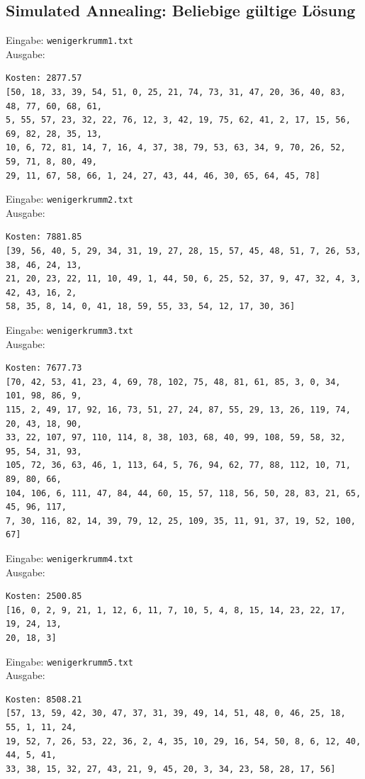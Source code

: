 \documentclass[a4paper,10pt,ngerman]{scrartcl}
\begin{document}
\subsection{Simulated Annealing: Beliebige gültige Lösung}
Eingabe: \lstinline|wenigerkrumm1.txt| \\ Ausgabe:
\begin{lstlisting}
Kosten: 2877.57
[50, 18, 33, 39, 54, 51, 0, 25, 21, 74, 73, 31, 47, 20, 36, 40, 83, 48, 77, 60, 68, 61, 
5, 55, 57, 23, 32, 22, 76, 12, 3, 42, 19, 75, 62, 41, 2, 17, 15, 56, 69, 82, 28, 35, 13, 
10, 6, 72, 81, 14, 7, 16, 4, 37, 38, 79, 53, 63, 34, 9, 70, 26, 52, 59, 71, 8, 80, 49, 
29, 11, 67, 58, 66, 1, 24, 27, 43, 44, 46, 30, 65, 64, 45, 78]
\end{lstlisting}
Eingabe: \lstinline|wenigerkrumm2.txt| \\ Ausgabe:
\begin{lstlisting}
Kosten: 7881.85
[39, 56, 40, 5, 29, 34, 31, 19, 27, 28, 15, 57, 45, 48, 51, 7, 26, 53, 38, 46, 24, 13, 
21, 20, 23, 22, 11, 10, 49, 1, 44, 50, 6, 25, 52, 37, 9, 47, 32, 4, 3, 42, 43, 16, 2, 
58, 35, 8, 14, 0, 41, 18, 59, 55, 33, 54, 12, 17, 30, 36]
\end{lstlisting}
Eingabe: \lstinline|wenigerkrumm3.txt| \\ Ausgabe:
\begin{lstlisting}
Kosten: 7677.73
[70, 42, 53, 41, 23, 4, 69, 78, 102, 75, 48, 81, 61, 85, 3, 0, 34, 101, 98, 86, 9,
115, 2, 49, 17, 92, 16, 73, 51, 27, 24, 87, 55, 29, 13, 26, 119, 74, 20, 43, 18, 90,
33, 22, 107, 97, 110, 114, 8, 38, 103, 68, 40, 99, 108, 59, 58, 32, 95, 54, 31, 93, 
105, 72, 36, 63, 46, 1, 113, 64, 5, 76, 94, 62, 77, 88, 112, 10, 71, 89, 80, 66, 
104, 106, 6, 111, 47, 84, 44, 60, 15, 57, 118, 56, 50, 28, 83, 21, 65, 45, 96, 117, 
7, 30, 116, 82, 14, 39, 79, 12, 25, 109, 35, 11, 91, 37, 19, 52, 100, 67]
\end{lstlisting}
Eingabe: \lstinline|wenigerkrumm4.txt| \\ Ausgabe:
\begin{lstlisting}
Kosten: 2500.85
[16, 0, 2, 9, 21, 1, 12, 6, 11, 7, 10, 5, 4, 8, 15, 14, 23, 22, 17, 19, 24, 13, 
20, 18, 3]
\end{lstlisting}
Eingabe: \lstinline|wenigerkrumm5.txt| \\ Ausgabe:
\begin{lstlisting}
Kosten: 8508.21
[57, 13, 59, 42, 30, 47, 37, 31, 39, 49, 14, 51, 48, 0, 46, 25, 18, 55, 1, 11, 24,
19, 52, 7, 26, 53, 22, 36, 2, 4, 35, 10, 29, 16, 54, 50, 8, 6, 12, 40, 44, 5, 41, 
33, 38, 15, 32, 27, 43, 21, 9, 45, 20, 3, 34, 23, 58, 28, 17, 56]
\end{lstlisting}
\end{document}
